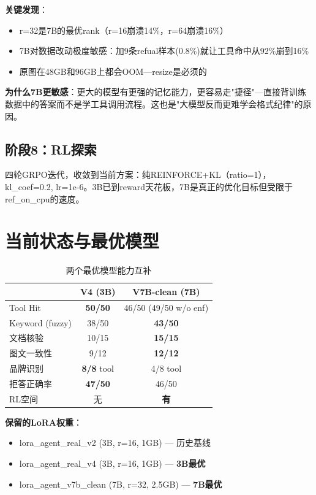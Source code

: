 \documentclass[fontset=none,11pt,a4paper]{ctexart}
\begin{document}
\textbf{关键发现}：
\begin{itemize}[nosep]
    \item r=32是7B的最优rank（r=16崩溃14\%，r=64崩溃16\%）
    \item 7B对数据改动极度敏感：加9条refual样本(0.8\%)就让工具命中从92\%崩到16\%
    \item 原图在48GB和96GB上都会OOM---resize是必须的
\end{itemize}

\textbf{为什么7B更敏感}：更大的模型有更强的记忆能力，更容易走"捷径"---直接背训练数据中的答案而不是学工具调用流程。这也是"大模型反而更难学会格式纪律"的原因。

\subsection{阶段8：RL探索}

四轮GRPO迭代，收敛到当前方案：纯REINFORCE+KL（ratio=1），kl\_coef=0.2, lr=1e-6。3B已到reward天花板，7B是真正的优化目标但受限于ref\_on\_cpu的速度。

\newpage

\section{当前状态与最优模型}

\begin{table}[htbp]
\centering
\begin{tabular}{lcc}
\toprule
 & V4 (3B) & V7B-clean (7B) \\
\midrule
Tool Hit & \textbf{50/50} & 46/50 (49/50 w/o enf) \\
Keyword (fuzzy) & 38/50 & \textbf{43/50} \\
文档核验 & 10/15 & \textbf{15/15} \\
图文一致性 & 9/12 & \textbf{12/12} \\
品牌识别 & \textbf{8/8} tool & 4/8 tool \\
拒答正确率 & \textbf{47/50} & 46/50 \\
RL空间 & 无 & \textbf{有} \\
\bottomrule
\end{tabular}
\caption{两个最优模型能力互补}
\end{table}

\textbf{保留的LoRA权重}：
\begin{itemize}[nosep]
    \item lora\_agent\_real\_v2 (3B, r=16, 1GB) --- 历史基线
    \item lora\_agent\_real\_v4 (3B, r=16, 1GB) --- \textbf{3B最优}
    \item lora\_agent\_v7b\_clean (7B, r=32, 2.5GB) --- \textbf{7B最优}
\end{itemize}
\end{document}
